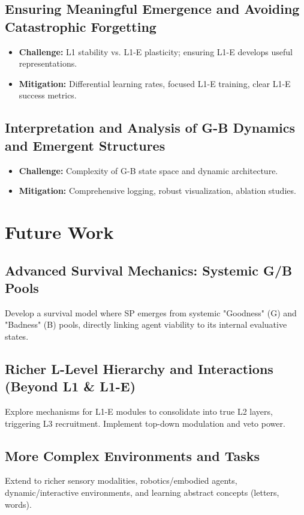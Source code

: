 \documentclass{article}
\begin{document}
\subsection{Ensuring Meaningful Emergence and Avoiding Catastrophic Forgetting}
\begin{itemize}
    \item \textbf{Challenge:} L1 stability vs. L1-E plasticity; ensuring L1-E develops useful representations.
    \item \textbf{Mitigation:} Differential learning rates, focused L1-E training, clear L1-E success metrics.
\end{itemize}

\subsection{Interpretation and Analysis of G-B Dynamics and Emergent Structures}
\begin{itemize}
    \item \textbf{Challenge:} Complexity of G-B state space and dynamic architecture.
    \item \textbf{Mitigation:} Comprehensive logging, robust visualization, ablation studies.
\end{itemize}

\section{Future Work}

\subsection{Advanced Survival Mechanics: Systemic G/B Pools}
Develop a survival model where SP emerges from systemic "Goodness" (G) and "Badness" (B) pools, directly linking agent viability to its internal evaluative states.

\subsection{Richer L-Level Hierarchy and Interactions (Beyond L1 \& L1-E)}
Explore mechanisms for L1-E modules to consolidate into true L2 layers, triggering L3 recruitment. Implement top-down modulation and veto power.

\subsection{More Complex Environments and Tasks}
Extend to richer sensory modalities, robotics/embodied agents, dynamic/interactive environments, and learning abstract concepts (letters, words).
\end{document}
